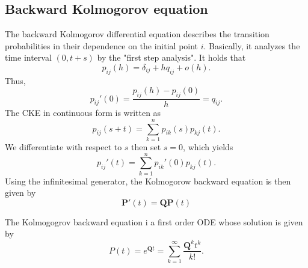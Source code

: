 \documentclass[12pt,a4paper]{article}
\begin{document}
\subsection{Backward Kolmogorov equation}
The backward Kolmogorov differential equation describes the transition probabilities in their dependence on the initial point $i$. 
Basically, it analyzes the time interval $(0,t+s)$ by the "first step analysis".
It holds that
$$
p_{ij}(h) = \delta_{ij}+h q_{ij}+o(h).
$$
Thus,
\begin{equation}
	p_{ij}'(0) = \frac{p_{ij}(h)-p_{ij}(0)}{h}
	= q_{ij}.
\end{equation}
The CKE in continuous form is written as
\begin{equation}
	p_{ij}(s+t) = \sum_{k=1}^n p_{ik}(s)p_{kj}(t).
\end{equation}
We differentiate with respect to $s$ then set $s=0$, which yields
\begin{equation}
	p_{ij}'(t) = \sum_{k=1}^n p_{ik}'(0)p_{kj}(t).
\end{equation}
Using the infinitesimal generator, the Kolmogorow backward equation is then given by
\begin{equation}
	\bm P'(t) = \bm Q \bm P(t)
\end{equation}

The Kolmogogrov backward equation i a first order ODE whose solution is given by 
\begin{equation}
	P(t) = e^{\bm Q t} = \sum_{k=1}^\infty \frac{\bm Q^k t^k}{k!}.
\end{equation}
\end{document}
